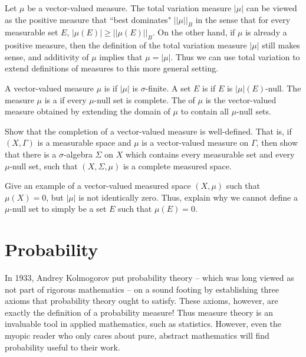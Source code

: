 \begin{subsec}
Let $\mu$ be a vector-valued measure.
The total variation measure $|\mu|$ can be viewed as the positive measure that ``best dominates" $||\mu||_B$ in the sense that for every measurable set $E$, $|\mu(E)| \geq ||\mu(E)||_B$.
On the other hand, if $\mu$ is already a positive measure, then the definition of the total variation measure $|\mu|$ still makes sense, and additivity of $\mu$ implies that $\mu = |\mu|$.
Thus we can use total variation to extend definitions of measures to this more general setting.
\end{subsec}

\begin{definition}
A vector-valued measure $\mu$ is  if $|\mu|$ is $\sigma$-finite.
A set $E$ is  if $E$ is $|\mu|(E)$-null.
The measure $\mu$ is a  if every $\mu$-null set is complete.
The  of $\mu$ is the vector-valued measure obtained by extending the domain of $\mu$ to contain all $\mu$-null sets.
\end{definition}

\begin{exercise}
Show that the completion of a vector-valued measure is well-defined.
That is, if $(X, \Gamma)$ is a measurable space and $\mu$ is a vector-valued measure on $\Gamma$, then show that there is a $\sigma$-algebra $\Sigma$ on $X$ which contains every measurable set and every $\mu$-null set, such that $(X, \Sigma, \mu)$ is a complete measured space.
\end{exercise}

\begin{exercise}
Give an example of a vector-valued measured space $(X, \mu)$ such that $\mu(X) = 0$, but $|\mu|$ is not identically zero.
Thus, explain why we cannot define a $\mu$-null set to simply be a set $E$ such that $\mu(E) = 0$.
\end{exercise}


\section{Probability}
In 1933, Andrey Kolmogorov put probability theory -- which was long viewed as not part of rigorous mathematics -- on a sound footing by establishing three axioms that probability theory ought to satisfy.
These axioms, however, are exactly the definition of a probability measure!
Thus measure theory is an invaluable tool in applied mathematics, such as statistics.
However, even the myopic reader who only cares about pure, abstract mathematics will find probability useful to their work.

